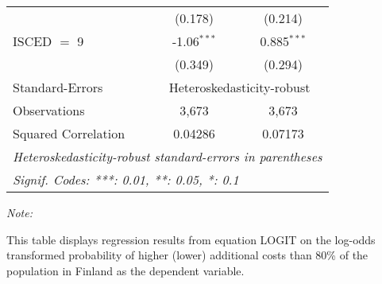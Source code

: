 \begin{table}[htbp!]
\begin{adjustbox}{width = 1\textwidth, max height = 0.95\textheight, center}
\begin{threeparttable}[b]
\begin{tabular}{lcc}
                                 & (0.178)        & (0.214)\\   
            ISCED $=$ 9          & -1.06$^{***}$  & 0.885$^{***}$\\   
                                 & (0.349)        & (0.294)\\   
            \midrule 
            Standard-Errors & \multicolumn{2}{c}{Heteroskedasticity-robust} \\ 
            Observations         & 3,673          & 3,673\\  
            Squared Correlation  & 0.04286        & 0.07173\\  
            \midrule \midrule
            \multicolumn{3}{l}{\emph{Heteroskedasticity-robust standard-errors in parentheses}}\\
            \multicolumn{3}{l}{\emph{Signif. Codes: ***: 0.01, **: 0.05, *: 0.1}}\\
         \end{tabular}
         
         \begin{tablenotes}\item \medskip \textit{Note:}
            \item This table displays regression results from equation LOGIT on the log-odds transformed probability of higher (lower) additional costs than 80\% of the population in Finland as the dependent variable. 
         \end{tablenotes}
      \end{threeparttable}
   \end{adjustbox}
\end{table}


